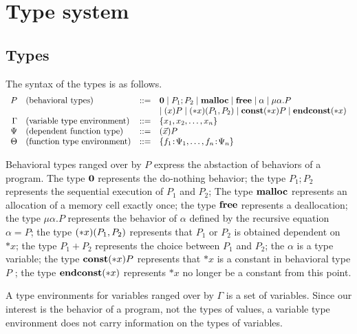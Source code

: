 \section{Type system}
\label{sec:typesystem}

\subsection{Types}
The syntax of the types is as follows.
\[
\begin{array}{rlcl}
  P & (\mbox{behavioral types})&::=& {\bf 0} \mid P_{1};P_{2} \mid \mathbf{malloc}\mid \mathbf{free} \mid \alpha \mid \mu\alpha.P \\
  &  &  & \mid (x)P \mid (*x)(P_1,P_2) \mid \mathbf{const}(*x) P  \mid \mathbf{endconst}(*x)\\
  \Gamma & (\mbox{variable type environment}) &::=& \{x_1, x_2, \dots, x_n\}\\
  \Psi & (\mbox{dependent function type}) &::=& (\vec{x})P\\
  \Theta & (\mbox{function type environment}) &::=& \{f_1\!:\! \Psi_1,\dots,f_n\!:\! \Psi_n\}\\
\end{array}
\]

Behavioral types ranged over by \(P\) express the abstaction of
behaviors of a program. The type \({\bf 0}\) represents the do-nothing
behavior; the type \(P_1;P_2\) represents the sequential execution of
\(P_1\) and \(P_2\); The type \(\mathbf{malloc}\) represents an allocation of
a memory cell exactly once; the type \(\mathbf{free}\) represents a
deallocation; the type \(\mu \alpha.P\) represents the behavior of
\(\alpha\) defined by the recursive equation \(\alpha = P\); the type
\((*x)(P_1,P_2)\) represents that \(P_1\) or \(P_2\) is obtained
dependent on \(*x\); the type \(P_1 + P_2\) represents the choice
between \(P_1\) and \(P_2\); the \(\alpha\) is a type variable; the
type \(\mathbf{const}(*x) P\) represents that \(*x\) is a constant in behavioral
type \(P\) ; the type \(\mathbf{endconst}(*x)\) represents \(*x\) no longer be a
constant from this point.

A type environments for variables ranged over by \(\Gamma\) is a set
of variables.  Since our interest is the behavior of a program, not
the types of values, a variable type environment does not carry
information on the types of variables.

